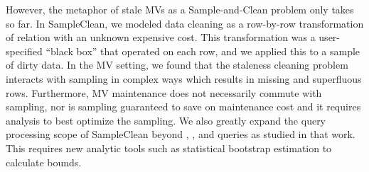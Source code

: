 However, the metaphor of stale MVs as a Sample-and-Clean problem only takes so far.
In SampleClean, we modeled data cleaning as a row-by-row transformation of relation with an unknown expensive cost. 
This transformation was a user-specified  ``black box'' that operated on each row, and we applied this to a sample of dirty data.
In the MV setting, we found that the staleness cleaning problem interacts with sampling in complex ways which results in missing and superfluous rows. 
Furthermore, MV maintenance does not necessarily commute with sampling, nor is sampling guaranteed to save on maintenance cost and it requires analysis to best optimize the sampling.
We also greatly expand the query processing scope of SampleClean beyond \sumfunc, \countfunc, and \avgfunc queries as studied in that work.
This requires new analytic tools such as statistical bootstrap estimation to calculate bounds.


